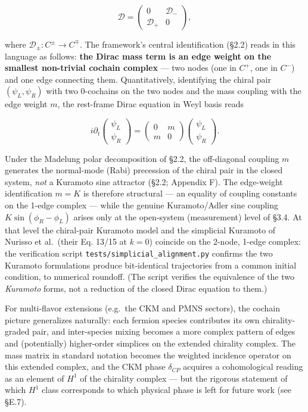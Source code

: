 \documentclass[
]{article}
\begin{document}
\[\mathcal{D} = \begin{pmatrix} 0 & \mathcal{D}_- \\ \mathcal{D}_+ & 0
\end{pmatrix},\]

where \(\mathcal{D}_\pm : C^\pm \to C^\mp\). The framework's central
identification (§2.2) reads in this language as follows: \textbf{the
Dirac mass term is an edge weight on the smallest non-trivial cochain
complex} --- two nodes (one in \(C^+\), one in \(C^-\)) and one edge
connecting them. Quantitatively, identifying the chiral pair
\((\psi_L, \psi_R)\) with two 0-cochains on the two nodes and the mass
coupling with the edge weight \(m\), the rest-frame Dirac equation in
Weyl basis reads

\[i\partial_t \begin{pmatrix} \psi_L \\ \psi_R \end{pmatrix} =
\begin{pmatrix} 0 & m \\ m & 0 \end{pmatrix}
\begin{pmatrix} \psi_L \\ \psi_R \end{pmatrix}.\]

Under the Madelung polar decomposition of §2.2, the off-diagonal
coupling \(m\) generates the normal-mode (Rabi) precession of the chiral
pair in the closed system, \emph{not} a Kuramoto sine attractor (§2.2;
Appendix F). The edge-weight identification \(m = K\) is therefore
structural --- an equality of coupling constants on the 1-edge complex
--- while the genuine Kuramoto/Adler sine coupling
\(K \sin(\phi_R - \phi_L)\) arises only at the open-system (measurement)
level of §3.4. At that level the chiral-pair Kuramoto model and the
simplicial Kuramoto of Nurisso et al.~(their Eq. 13/15 at \(k = 0\))
coincide on the 2-node, 1-edge complex: the verification script
\texttt{tests/simplicial\_alignment.py} confirms the two Kuramoto
formulations produce bit-identical trajectories from a common initial
condition, to numerical roundoff. (The script verifies the equivalence
of the two \emph{Kuramoto} forms, not a reduction of the closed Dirac
equation to them.)

For multi-flavor extensions (e.g.~the CKM and PMNS sectors), the cochain
picture generalizes naturally: each fermion species contributes its own
chirality-graded pair, and inter-species mixing becomes a more complex
pattern of edges and (potentially) higher-order simplices on the
extended chirality complex. The mass matrix in standard notation becomes
the weighted incidence operator on this extended complex, and the CKM
phase \(\delta_{CP}\) acquires a cohomological reading as an element of
\(H^1\) of the chirality complex --- but the rigorous statement of which
\(H^1\) class corresponds to which physical phase is left for future
work (see §E.7).
\end{document}
